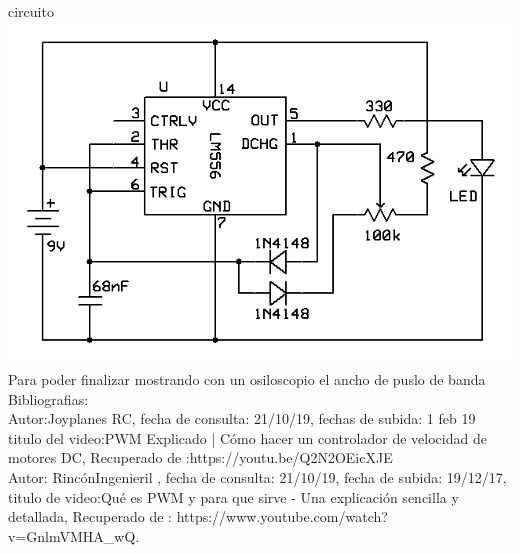 \documentclass[letterpaper]{article}
\begin{document}
circuito
\includegraphics[scale=.5]{PWM.PNG} 
\\Para poder finalizar mostrando con un osiloscopio el ancho de puslo de banda
\newpage
Bibliografias: \\
Autor:Joyplanes RC, fecha de consulta: 21/10/19, fechas de subida: 1 feb 19 titulo del video:PWM Explicado | Cómo hacer un controlador de velocidad de motores DC, Recuperado de :https://youtu.be/Q2N2OEicXJE\\

Autor:
RincónIngenieril
, fecha de consulta: 21/10/19, fecha de subida: 19/12/17, titulo de video:Qué es PWM y para que sirve - Una explicación sencilla y detallada, Recuperado de : https://www.youtube.com/watch?v=GnlmVMHA_wQ.
\end{document}
